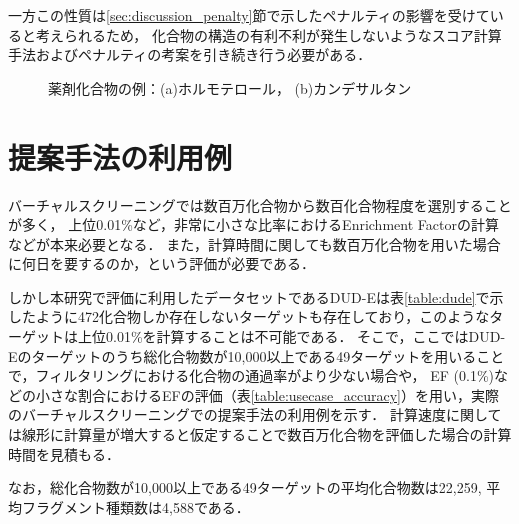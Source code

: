 一方この性質は\ref{sec:discussion_penalty}節で示したペナルティの影響を受けていると考えられるため，
化合物の構造の有利不利が発生しないようなスコア計算手法およびペナルティの考案を引き続き行う必要がある．

\begin{figure}[t]
 \begin{center}
 \end{center}
  \caption{薬剤化合物の例：(a)ホルモテロール， (b)カンデサルタン}
  \label{fig:drugs}
\end{figure}


\section{提案手法の利用例}
バーチャルスクリーニングでは数百万化合物から数百化合物程度を選別することが多く，
上位0.01\%など，非常に小さな比率におけるEnrichment Factorの計算などが本来必要となる．
また，計算時間に関しても数百万化合物を用いた場合に何日を要するのか，という評価が必要である．

しかし本研究で評価に利用したデータセットであるDUD-Eは表\ref{table:dude}で示したように472化合物しか存在しないターゲットも存在しており，このようなターゲットは上位0.01\%を計算することは不可能である．
そこで，ここではDUD-Eのターゲットのうち総化合物数が10,000以上である49ターゲットを用いることで，フィルタリングにおける化合物の通過率がより少ない場合や，
EF (0.1\%)などの小さな割合におけるEFの評価（表\ref{table:usecase_accuracy}）を用い，実際のバーチャルスクリーニングでの提案手法の利用例を示す．
計算速度に関しては線形に計算量が増大すると仮定することで数百万化合物を評価した場合の計算時間を見積もる．

なお，総化合物数が10,000以上である49ターゲットの平均化合物数は22,259, 平均フラグメント種類数は4,588である．

